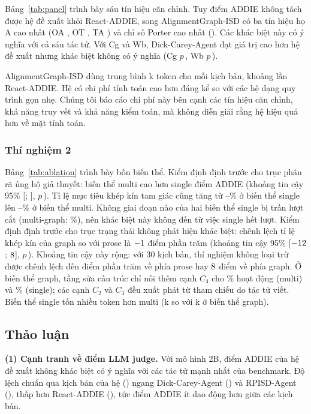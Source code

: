 \documentclass[conference,a4paper]{IEEEtran}
\begin{document}
Bảng~\ref{tab:panel} trình bày sáu tín hiệu căn chỉnh. Tuy điểm ADDIE không tách
được hệ đề xuất khỏi React-ADDIE, song AlignmentGraph-ISD có ba tín hiệu họ A cao nhất (OA \panAGOA, OT \panAGOT, TA \panAGTA) và chỉ số Porter cao
nhất (\panAGPo). Các khác biệt này có ý nghĩa với cả sáu tác tử. Với Cg và Wb,
Dick-Carey-Agent đạt giá trị cao hơn hệ đề xuất nhưng khác biệt không có ý nghĩa
(Cg $p$\,\panDickCgP, Wb $p$\,\panDickWbP).

AlignmentGraph-ISD dùng trung bình \cmpAGTok{}k token cho mỗi kịch bản, khoảng
\cmpTokRatioReact{} lần React-ADDIE. Hệ có chi phí tính toán cao hơn đáng kể so với các hệ dạng quy
trình gọn nhẹ. Chúng tôi báo cáo chi phí này bên cạnh các tín hiệu căn chỉnh, khả
năng truy vết và khả năng kiểm toán, mà không diễn giải rằng hệ hiệu quả hơn về
mặt tính toán.

\subsubsection{Thí nghiệm 2}
Bảng~\ref{tab:ablation} trình bày bốn biến thể. Kiểm định định trước cho trục phân rã
ủng hộ giả thuyết: biến thể multi cao hơn single \ablHDDiff{} điểm ADDIE (khoảng
tin cậy 95\% [\ablHDCILo; \ablHDCIHi], $p$\,\ablHDP). Tỉ lệ mục tiêu khép kín tam
giác cũng tăng từ \ablSGTriad--\ablSPTriad\% ở biến thể single lên
\ablMGTriad--\ablMPTriad\% ở biến thể multi. Không giai đoạn nào của hai biến thể single bị trần lượt cắt
(multi-graph: \ablMGCut\%), nên khác biệt này không đến từ việc single hết lượt. Kiểm định định trước cho trục trạng thái
không phát hiện khác biệt: chênh lệch tỉ lệ khép kín của graph so với prose là $-1$ điểm phần trăm (khoảng tin cậy 95\% [$-12$; $8$],
$p$\,\ablHSP). Khoảng tin cậy này rộng: với 30 kịch bản, thí nghiệm không loại trừ được
chênh lệch đến \ablHSCILoAbs{} điểm phần trăm về phía prose hay $8$ điểm về phía graph.
Ở biến thể graph, tầng sửa cấu trúc chỉ nối thêm cạnh $C_4$ cho \ablMGRepaired\% hoạt động (multi) và
\ablSGRepaired\% (single); các cạnh $C_2$ và $C_3$ đều xuất phát từ tham chiếu do tác tử viết. Biến thể single tốn nhiều token hơn multi (\ablSGTok{}k so với
\ablMGTok{}k ở biến thể graph).

\subsection{Thảo luận}
\label{sec:discussion}

\textbf{(1) Cạnh tranh về điểm LLM judge.} Với mô hình 2B, điểm ADDIE của hệ đề xuất không khác biệt có ý nghĩa với các tác tử mạnh nhất của benchmark. Độ lệch chuẩn qua
kịch bản của hệ (\cmpAGAddieSD) ngang Dick-Carey-Agent (\cmpDickAddieSD) và RPISD-Agent (\cmpRpisdAddieSD), thấp hơn React-ADDIE (\cmpReactAddieSD), tức điểm ADDIE ít dao động hơn giữa các kịch bản.
\end{document}

